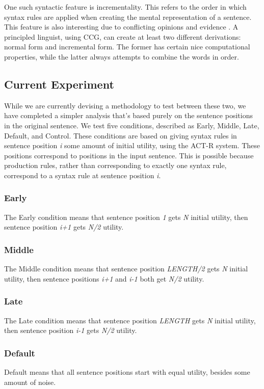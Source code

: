 One such syntactic feature is incrementality. This refers to the order in which syntax rules are applied when creating the mental representation of a sentence. This feature is also interesting due to conflicting opinions and evidence \cite{tag1}\cite{radical}\cite{incremental}. A principled linguist, using CCG, can create at least two different derivations: normal ­form and incremental form. The former has certain nice computational properties, while the latter always attempts to combine the words in order.

\subsection{Current Experiment}
While we are currently devising a methodology to test between these two, we have completed a simpler analysis that's based purely on the sentence positions in the original sentence. We test five conditions, described as Early, Middle, Late, Default, and Control. These conditions are based on giving syntax rules in sentence position \textit{i} some amount of initial utility, using the ACT-R system. These positions correspond to positions in the input sentence. This is possible because production rules, rather than corresponding to exactly one syntax rule, correspond to a syntax rule at sentence position \textit{i}.

\subsubsection{Early}
The Early condition means that sentence position \textit{1} gets \textit{N} initial utility, then sentence position \textit{i+1} gets \textit{N/2} utility.

\subsubsection{Middle}
The Middle condition means that sentence position \textit{LENGTH/2} gets \textit{N} initial utility, then sentence positions \textit{i+1} and \textit{i-1} both get \textit{N/2} utility.

\subsubsection{Late}
The Late condition means that sentence position \textit{LENGTH} gets \textit{N} initial utility, then sentence position \textit{i-1} gets \textit{N/2} utility.

\subsubsection{Default}
Default means that all sentence positions start with equal utility, besides some amount of noise.

